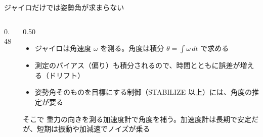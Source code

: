 
\begin{frame}{ジャイロだけでは姿勢角が求まらない}
  \begin{columns}[c]
    \begin{column}{0.48\textwidth}
      \centering
    \end{column}
    \begin{column}{0.50\textwidth}
      \footnotesize
      \begin{itemize}\setlength{\itemsep}{3pt}
        \item ジャイロは角速度 $\omega$ を測る。角度は積分 $\theta=\int\omega\,dt$ で求める
        \item 測定のバイアス（偏り）も積分されるので、時間とともに誤差が増える（ドリフト）
        \item 姿勢角そのものを目標にする制御（STABILIZE 以上）には、角度の推定が要る
      \end{itemize}
      \begin{alertblock}{そこで}
        \scriptsize 重力の向きを測る加速度計で角度を補う。加速度計は長期で安定だが、短期は振動や加減速でノイズが乗る
      \end{alertblock}
    \end{column}
  \end{columns}
\end{frame}

